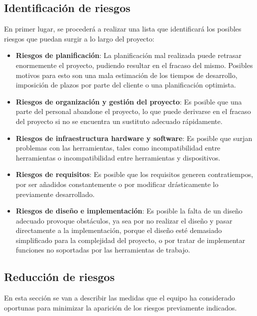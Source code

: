 \subsection{Identificación de riesgos}
En primer lugar, se procederá a realizar una lista que identificará los posibles riesgos
que puedan surgir a lo largo del proyecto:
\begin{itemize}

    \item \textbf{Riesgos de planificación}: La planificación mal realizada puede retrasar 
    enormemente el proyecto, pudiendo resultar en el fracaso del mismo. Posibles motivos para 
    esto son una mala estimación de los tiempos de desarrollo, imposición de plazos por parte del 
    cliente o una planificación optimista.

    \item \textbf{Riesgos de organización y gestión del proyecto}: Es posible que una parte del personal 
    abandone el proyecto, lo que puede derivarse en el fracaso del proyecto si no se encuentra un sustituto 
    adecuado rápidamente.

    \item \textbf{Riesgos de infraestructura hardware y software}: Es posible que surjan problemas con las 
    herramientas, tales como incompatibilidad entre herramientas o incompatibilidad entre herramientas y dispositivos.

    \item \textbf{Riesgos de requisitos}: Es posible que los requisitos generen contratiempos, por ser añadidos constantemente 
    o por modificar drásticamente lo previamente desarrollado.

    \item \textbf{Riesgos de diseño e implementación}: Es posible la falta de un diseño adecuado provoque obstáculos, ya sea 
    por no realizar el diseño y pasar directamente a la implementación, porque el diseño esté demasiado simplificado para 
    la complejidad del proyecto, o por tratar de implementar funciones no soportadas por las herramientas de trabajo.

\end{itemize}

\subsection{Reducción de riesgos}
En esta sección se van a describir las medidas que el equipo ha considerado oportunas para minimizar la aparición de 
los riesgos previamente indicados.

